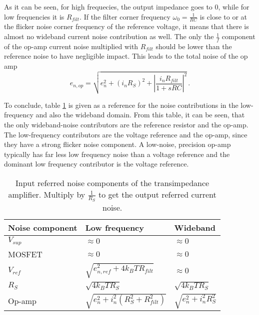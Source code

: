 As it can be seen, for high frequecies, the output impedance goes to \num{0}, while for low frequencies it is $R_{filt}$. If the filter corner frequency $\omega_0 = \frac{1}{RC}$ is close to or at the flicker noise corner frequency of the reference voltage, it means that there is almost no wideband current noise contribution as well. The only the $\frac{1}{f}$ component of the op-amp current noise multiplied with $R_{filt}$ should be lower than the reference noise to have negligible impact.
This leads to the total noise of the op amp
\begin{equation}
    e_{n,op} = \sqrt{e_n^2 + (i_n R_S)^2 + \left|\frac{i_n R_{filt}}{1+sRC}\right|^2} \,.
\end{equation}

To conclude, table \ref{tab:current_source_noise_contributers} is given as a reference for the noise contributions in the low-frequency and also the wideband domain. From this table, it can be seen, that the only wideband-noise contributors are the reference resistor and the op-amp. The low-frequency contributors are the voltage reference and the op-amp, since they have a strong flicker noise component. A low-noise, precision op-amp typically has far less low frequency noise than a voltage reference and the dominant low frequency contributor is the voltage reference.

\begin{table}[ht]
    \centering
    \begin{tabular}{lll}
        Noise component& Low frequency& Wideband \\
        \midrule
        $V_{sup}$ & $\approx 0$ & $\approx 0$\\
        MOSFET & $\approx 0$ & $\approx 0$\\
        $V_{ref}$ & $\sqrt{e_{n,ref}^2 + 4 k_B T R_{filt}} $ & $\approx 0$\\
        $R_S$ & $\sqrt{4 k_B T R_S}$ & $\sqrt{4 k_B T R_S}$\\
        Op-amp & $\sqrt{e_n^2 + i_n^2 (R_S^2 + R_{filt}^2)}$ & $\sqrt{e_n^2 + i_n^2 R_S^2}$
    \end{tabular}
    \caption{Input referred noise components of the transimpedance amplifier. Multiply by $\frac{1}{R_S}$ to get the output referred current noise.}
    \label{tab:current_source_noise_contributers}
\end{table}

\clearpage
